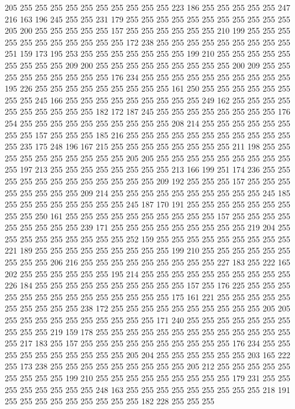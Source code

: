 205 255 255 255 255 255 255 255 255 255 255 223 186 255 255 255 255 255 247 216
163 196 245 255 255 231 179 255 255 255 255 255 255 255 255 255 255 255 205 200
255 255 255 255 255 157 255 255 255 255 255 255 210 199 255 255 255 255 255 255
255 255 255 255 255 172 238 255 255 255 255 255 255 255 255 255 251 159 173 195
253 255 255 255 255 255 255 255 199 210 255 255 255 255 255 255 255 255 255 209
200 255 255 255 255 255 255 255 255 255 200 209 255 255 255 255 255 255 255 255
255 176 234 255 255 255 255 255 255 255 255 255 255 195 226 255 255 255 255 255
255 255 255 255 161 250 255 255 255 255 255 255 255 255 245 166 255 255 255 255
255 255 255 255 255 249 162 255 255 255 255 255 255 255 255 255 255 182 172 187
245 255 255 255 255 255 255 255 255 176 254 255 255 255 255 255 255 255 255 255
255 208 214 255 255 255 255 255 255 255 255 157 255 255 255 185 216 255 255 255
255 255 255 255 255 255 255 255 255 235 175 248 196 167 215 255 255 255 255 255
255 255 255 211 198 255 255 255 255 255 255 255 255 255 255 205 205 255 255 255
255 255 255 255 255 255 255 197 213 255 255 255 255 255 255 255 255 213 166 199
251 174 236 255 255 255 255 255 255 255 255 255 255 255 255 209 192 255 255 255
157 255 255 255 255 255 255 255 255 209 214 255 255 255 255 255 255 255 255 255
255 245 185 255 255 255 255 255 255 255 255 245 187 170 191 255 255 255 255 255
255 255 255 255 250 161 255 255 255 255 255 255 255 255 255 255 157 255 255 255
255 255 255 255 255 255 239 171 255 255 255 255 255 255 255 255 255 219 204 255
255 255 255 255 255 255 255 255 252 159 255 255 255 255 255 255 255 255 255 221
189 255 255 255 255 255 255 255 255 255 199 210 255 255 255 255 255 255 255 255
255 206 216 255 255 255 255 255 255 255 255 255 227 183 255 222 165 202 255 255
255 255 255 255 195 214 255 255 255 255 255 255 255 255 255 255 226 184 255 255
255 255 255 255 255 255 255 255 157 255 176 225 255 255 255 255 255 255 255 255
255 255 255 255 255 255 175 161 221 255 255 255 255 255 255 255 255 255 255 238
172 255 255 255 255 255 255 255 255 255 255 205 205 255 255 255 255 255 255 255
255 255 255 171 240 255 255 255 255 255 255 255 255 255 255 219 159 178 255 255
255 255 255 255 255 255 255 255 255 255 255 255 217 183 255 157 255 255 255 255
255 255 255 255 255 255 176 234 255 255 255 255 255 255 255 255 255 255 205 204
255 255 255 255 255 255 203 165 222 255 173 238 255 255 255 255 255 255 255 255
255 205 212 255 255 255 255 255 255 255 255 255 199 210 255 255 255 255 255 255
255 255 255 179 231 255 255 255 255 255 255 255 255 248 163 255 255 255 255 255
255 255 255 255 218 191 255 255 255 255 255 255 255 255 255 182 228 255 255 255
